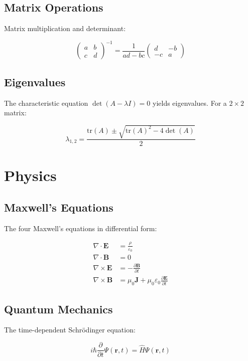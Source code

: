 \documentclass{article}
\begin{document}
\subsection{Matrix Operations}

Matrix multiplication and determinant:

$$\begin{pmatrix} a & b \\ c & d \end{pmatrix}^{-1} = \frac{1}{ad - bc} \begin{pmatrix} d & -b \\ -c & a \end{pmatrix}$$

\subsection{Eigenvalues}

The characteristic equation $\det(A - \lambda I) = 0$ yields eigenvalues. For a $2 \times 2$ matrix:

$$\lambda_{1,2} = \frac{\text{tr}(A) \pm \sqrt{\text{tr}(A)^2 - 4\det(A)}}{2}$$

\section{Physics}

\subsection{Maxwell's Equations}

The four Maxwell's equations in differential form:

\begin{align}
\nabla \cdot \mathbf{E} &= \frac{\rho}{\varepsilon_0} \\
\nabla \cdot \mathbf{B} &= 0 \\
\nabla \times \mathbf{E} &= -\frac{\partial \mathbf{B}}{\partial t} \\
\nabla \times \mathbf{B} &= \mu_0 \mathbf{J} + \mu_0 \varepsilon_0 \frac{\partial \mathbf{E}}{\partial t}
\end{align}

\subsection{Quantum Mechanics}

The time-dependent Schrödinger equation:

$$i\hbar \frac{\partial}{\partial t} \Psi(\mathbf{r}, t) = \hat{H} \Psi(\mathbf{r}, t)$$
\end{document}
